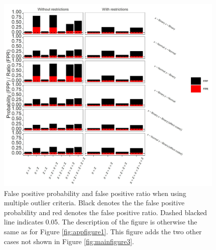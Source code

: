 \begin{figure}[hbt!]
\includegraphics[scale=0.95]{R/Analysis/Result/Figures/Figure1BSI.jpeg}
\centering
\caption{False positive probability and false positive ratio when using multiple outlier criteria. Black denotes the the false positive probability and red denotes the false positive ratio. Dashed blacked line indicates 0.05. The description of the figure is otherwise the same as for Figure \ref{fig:appfigure1}. This figure adds the two other cases not shown in Figure \ref{fig:mainfigure3}.
}
\label{fig:appfigure4}
\end{figure}

